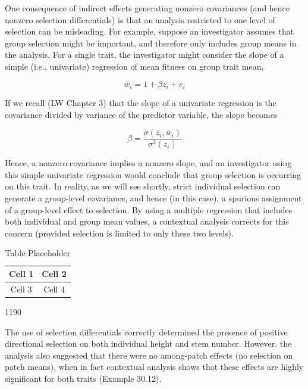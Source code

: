 \documentclass{article}
\begin{document}
One consequence of indirect effects generating nonzero covariances (and hence nonzero selection differentials) is that an analysis restricted to one level of selection can be misleading. For example, suppose an investigator assumes that group selection might be important, and therefore only includes group means in the analysis. For a single trait, the investigator might consider the slope of a simple (i.e., univariate) regression of mean fitness on group trait mean,

\begin{equation}
\overline{w}_{i}=1+\beta\overline{z}_{i}+e_{i}
\tag{30.37a}
\label{eq:30_37a}
\end{equation}

If we recall (LW Chapter 3) that the slope of a univariate regression is the covariance divided by variance of the predictor variable, the slope becomes

\begin{equation}
\beta=\frac{\sigma(\overline{z}_{i},\overline{w}_{i})}{\sigma^{2}(\overline{z}_{i})}
\tag{30.37b}
\label{eq:30_37b}
\end{equation}

Hence, a nonzero covariance implies a nonzero slope, and an investigator using this simple univariate regression would conclude that group selection is occurring on this trait. In reality, as we will see shortly, strict individual selection can generate a group-level covariance, and hence (in this case), a spurious assignment of a group-level effect to selection. By using a multiple regression that includes both individual and group mean values, a contextual analysis corrects for this concern (provided selection is limited to only these two levels).

\begin{table}[h]
\centering
\begin{tabular}{|c|c|}
\hline
Cell 1 & Cell 2 \\
\hline
Cell 3 & Cell 4 \\
\hline
\end{tabular}
\caption{Table Placeholder}
\end{table}

1190

The use of selection differentials correctly determined the presence of positive directional selection on both individual height and stem number. However, the analysis also suggested that there were no among-patch effects (no selection on patch means), when in fact contextual analysis shows that these effects are highly significant for both traits (Example 30.12).
\end{document}

